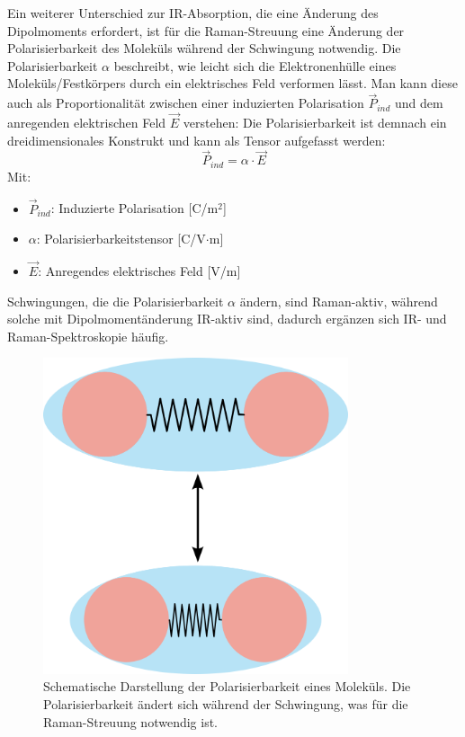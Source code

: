 Ein weiterer Unterschied zur IR-Absorption, die eine Änderung des Dipolmoments erfordert, ist für die Raman-Streuung 
eine Änderung der Polarisierbarkeit des Moleküls während der Schwingung notwendig. Die Polarisierbarkeit $\alpha$ beschreibt, 
wie leicht sich die Elektronenhülle eines Moleküls/Festkörpers durch ein elektrisches Feld verformen lässt.
Man kann diese auch als Proportionalität zwischen einer induzierten Polarisation $\vec{P}_{ind}$ und dem anregenden elektrischen Feld $\vec{E}$ verstehen:
Die Polarisierbarkeit ist demnach ein dreidimensionales Konstrukt und kann als Tensor aufgefasst werden:
\begin{equation}
    \vec{P}_{ind} = \alpha \cdot \vec{E}
\end{equation}
Mit:
\begin{itemize}
    \item $\vec{P}_{ind}$: Induzierte Polarisation [C/m$^2$]
    \item $\alpha$: Polarisierbarkeitstensor [C/V$\cdot$m]
    \item $\vec{E}$: Anregendes elektrisches Feld [V/m]
\end{itemize}

Schwingungen, die die Polarisierbarkeit $\alpha$ ändern, sind 
Raman-aktiv, während solche mit Dipolmomentänderung IR-aktiv sind, dadurch ergänzen sich IR- und Raman-Spektroskopie häufig.\\

\begin{figure}[H]
    \centering
    \includegraphics[width=0.8\textwidth]{1_Skript/Inkscape/Polarisierbarkeit.png}
    \caption{Schematische Darstellung der Polarisierbarkeit eines Moleküls. Die Polarisierbarkeit ändert sich während der Schwingung, was für die Raman-Streuung notwendig ist.}
    \label{fig:Polarisierbarkeit}
\end{figure}

